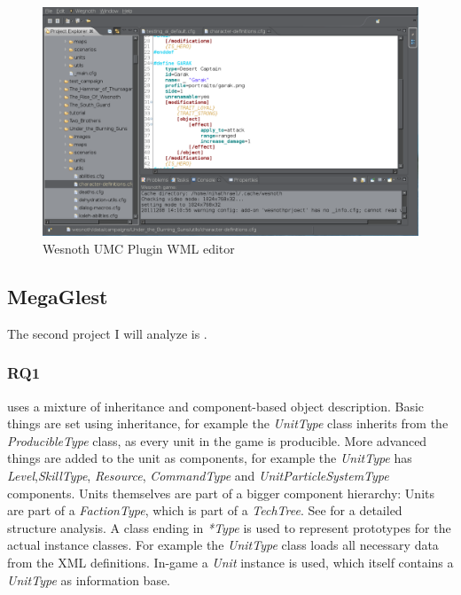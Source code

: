 \begin{figure}[H]
    \centering
    \includegraphics[width=\textwidth]{pics/wesnothumc}
    \caption{Wesnoth UMC Plugin WML editor}
    \label{fig:wesnothumc}
\end{figure}


\subsection{MegaGlest}
The second project I will analyze is \GLEST{}.

\subsubsection{RQ1}
\GLEST{} uses a mixture of inheritance and component-based object description. Basic things are set using
inheritance, for example the \textit{UnitType} class inherits from the \textit{ProducibleType} class, as every unit in
the game is producible. More advanced things are added to the unit as components, for example the \textit{UnitType} has
\textit{Level},\textit{SkillType}, \textit{Resource}, \textit{CommandType} and \textit{UnitParticleSystemType}
components. Units themselves are part of a bigger component hierarchy: Units are part of a \textit{FactionType}, which
is part of a \textit{TechTree}. See  for a detailed structure analysis. A class ending in
\textit{*Type} is used to represent prototypes for the actual instance classes. For example the \textit{UnitType} class loads all
necessary data from the XML definitions. In-game a \textit{Unit} instance is used, which itself contains a
\textit{UnitType} as information base.

